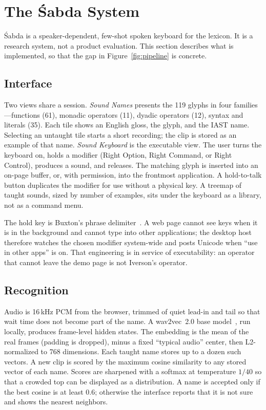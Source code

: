 \documentclass[manuscript, review, anonymous]{acmart}
\begin{document}
\section{The {\'S}abda System}
\label{sec:system}

{\'S}abda is a speaker-dependent, few-shot spoken keyboard for the lexicon. It is a research system, not a product evaluation. This section describes what is implemented, so that the gap in Figure~\ref{fig:pipeline} is concrete.

\subsection{Interface}

Two views share a session. \emph{Sound Names} presents the 119 glyphs in four families---functions (61), monadic operators (11), dyadic operators (12), syntax and literals (35). Each tile shows an English gloss, the glyph, and the IAST name. Selecting an untaught tile starts a short recording; the clip is stored as an example of that name. \emph{Sound Keyboard} is the executable view. The user turns the keyboard on, holds a modifier (Right Option, Right Command, or Right Control), produces a sound, and releases. The matching glyph is inserted into an on-page buffer, or, with permission, into the frontmost application. A hold-to-talk button duplicates the modifier for use without a physical key. A treemap of taught sounds, sized by number of examples, sits under the keyboard as a library, not as a command menu.

The hold key is Buxton's phrase delimiter~\cite{Buxton1986Chunking}. A web page cannot see keys when it is in the background and cannot type into other applications; the desktop host therefore watches the chosen modifier system-wide and posts Unicode when ``use in other apps'' is on. That engineering is in service of executability: an operator that cannot leave the demo page is not Iverson's operator.

\subsection{Recognition}

Audio is 16\,kHz PCM from the browser, trimmed of quiet lead-in and tail so that wait time does not become part of the name. A wav2vec~2.0 base model~\cite{Baevski2020Wav2vec}, run locally, produces frame-level hidden states. The embedding is the mean of the real frames (padding is dropped), minus a fixed ``typical audio'' center, then L2-normalized to 768 dimensions. Each taught name stores up to a dozen such vectors. A new clip is scored by the maximum cosine similarity to any stored vector of each name. Scores are sharpened with a softmax at temperature $1/40$ so that a crowded top can be displayed as a distribution. A name is accepted only if the best cosine is at least $0.6$; otherwise the interface reports that it is not sure and shows the nearest neighbors.
\end{document}

